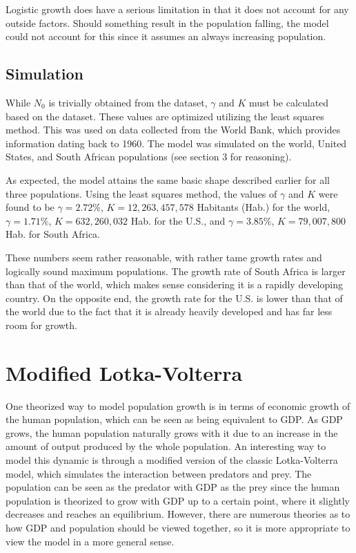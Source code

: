 \documentclass[a4paper]{article}
\begin{document}
Logistic growth does have a serious limitation in that it does not account for any outside factors. Should something result in the population falling, the model could not account for this since it assumes an always increasing population. 

\subsection{Simulation}

While $N_0$ is trivially obtained from the dataset, $\gamma$ and $K$ must be calculated based on the dataset. These values are optimized utilizing the least squares method. This was used on data collected from the World Bank, which provides information dating back to 1960. The model was simulated on the world, United States, and South African populations (see section 3 for reasoning).

As expected, the model attains the same basic shape described earlier for all three populations. Using the least squares method, the values of $\gamma$ and $K$ were found to be
 $\gamma = 2.72\%$, $K = 12,263,457,578 $ Habitants (Hab.) for the world, 
 $\gamma = 1.71\%$, $K = 632,260,032$ Hab. for the U.S., and 
 $\gamma = 3.85\%$, $K = 79,007,800$ Hab. for South Africa.
 
These numbers seem rather reasonable, with rather tame growth rates and logically sound maximum populations. The growth rate of South Africa is larger than that of the world, which makes sense considering it is a rapidly developing country. On the opposite end, the growth rate for the U.S. is lower than that of the world due to the fact that it is already heavily developed and has far less room for growth.


\section{Modified Lotka-Volterra}

One theorized way to model population growth is in terms of economic growth of the human population, which can be seen as being equivalent to GDP. As GDP grows, the human population naturally grows with it due to an increase in the amount of output produced by the whole population. An interesting way to model this dynamic is through a modified version of the classic Lotka-Volterra model, which simulates the interaction between predators and prey. The population can be seen as the predator with GDP as the prey since the human population is theorized to grow with GDP up to a certain point, where it slightly decreases and reaches an equilibrium. However, there are numerous theories as to how GDP and population should be viewed together, so it is more appropriate to view the model in a more general sense. 
\end{document}
